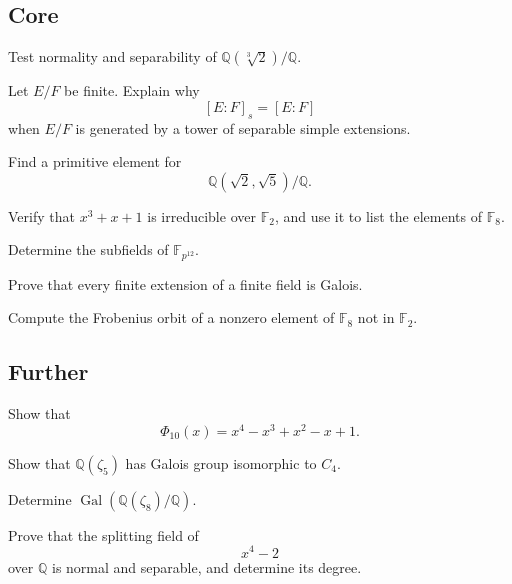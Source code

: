 \subsection*{Core}
\begin{exercise}[Core] Test normality and separability of
\(\mathbb Q(\sqrt[3]2)/\mathbb Q\).
\end{exercise}
\begin{exercise}[Core] Let \(E/F\) be finite.  Explain why
\[
[E:F]_s=[E:F]
\]
when \(E/F\) is generated by a tower of separable simple extensions.
\end{exercise}
\begin{exercise}[Core] Find a primitive element for
\[
\mathbb Q(\sqrt2,\sqrt5)/\mathbb Q.
\]
\end{exercise}
\begin{exercise}[Core] Verify that \(x^3+x+1\) is irreducible over
\(\mathbb F_2\), and use it to list the elements of \(\mathbb F_8\).
\end{exercise}
\begin{exercise}[Core] Determine the subfields of \(\mathbb F_{p^{12}}\).
\end{exercise}
\begin{exercise}[Core] Prove that every finite extension of a finite field
is Galois.
\end{exercise}
\begin{exercise}[Core] Compute the Frobenius orbit of a nonzero element of
\(\mathbb F_8\) not in \(\mathbb F_2\).
\end{exercise}

\subsection*{Further}
\begin{exercise}[Further] Show that
\[
\Phi_{10}(x)=x^4-x^3+x^2-x+1.
\]
\end{exercise}
\begin{exercise}[Further] Show that \(\mathbb Q(\zeta_5)\) has Galois group
isomorphic to \(C_4\).
\end{exercise}
\begin{exercise}[Further] Determine
\(\operatorname{Gal}(\mathbb Q(\zeta_8)/\mathbb Q)\).
\end{exercise}
\begin{exercise}[Further] Prove that the splitting field of
\[
x^4-2
\]
over \(\mathbb Q\) is normal and separable, and determine its degree.
\end{exercise}

